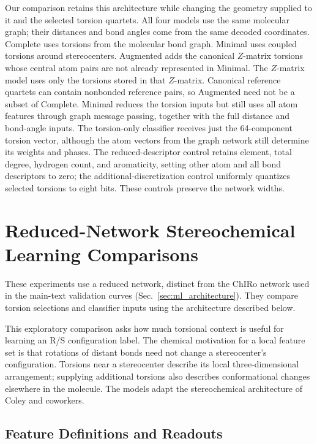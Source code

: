 \documentclass[%
 preprint,
superscriptaddress,
 amsmath,amssymb,
 aip,
 jcp,
]{revtex4-2}
\begin{document}
Our comparison retains this architecture while changing the geometry supplied to it and the selected torsion quartets.
All four models use the same molecular graph; their distances and bond angles come from the same decoded coordinates.
Complete uses torsions from the molecular bond graph.
Minimal uses coupled torsions around stereocenters.
Augmented adds the canonical $Z$-matrix torsions whose central atom pairs are not already represented in Minimal.
The $Z$-matrix model uses only the torsions stored in that $Z$-matrix.
Canonical reference quartets can contain nonbonded reference pairs, so Augmented need not be a subset of Complete.
Minimal reduces the torsion inputs but still uses all atom features through graph message passing, together with the full distance and bond-angle inputs.
The torsion-only classifier receives just the 64-component torsion vector, although the atom vectors from the graph network still determine its weights and phases.
The reduced-descriptor control retains element, total degree, hydrogen count, and aromaticity, setting other atom and all bond descriptors to zero; the additional-discretization control uniformly quantizes selected torsions to eight bits.
These controls preserve the network widths.

\section{Reduced-Network Stereochemical Learning Comparisons}
\label{sec:ml_reduced_settings}

These experiments use a reduced network, distinct from the ChIRo network used in the main-text validation curves (Sec.~\ref{sec:ml_architecture}). They compare torsion selections and classifier inputs using the architecture described below.

This exploratory comparison asks how much torsional context is useful for learning an R/S configuration label.
The chemical motivation for a local feature set is that rotations of distant bonds need not change a stereocenter's configuration.
Torsions near a stereocenter describe its local three-dimensional arrangement; supplying additional torsions also describes conformational changes elsewhere in the molecule.
The models adapt the stereochemical architecture of Coley and coworkers.\cite{Coley2021:chiro}

\subsection{Feature Definitions and Readouts}
\end{document}
